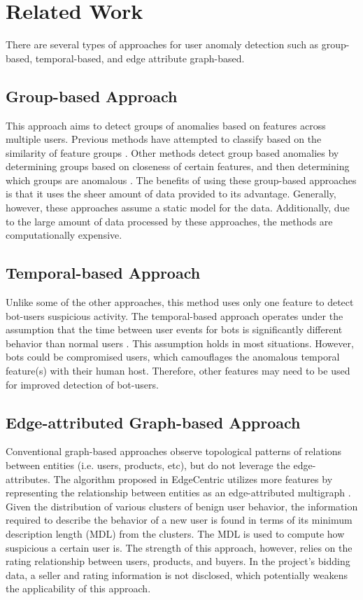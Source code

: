 \documentclass{article} %
\begin{document}
\section{Related Work}

There are several types of approaches for user anomaly detection such as group-based, temporal-based, and edge attribute graph-based.

\subsection{Group-based Approach}

This approach aims to detect groups of anomalies based on features across multiple users.
Previous methods have attempted to classify based on the similarity of feature groups \cite{ndsync}.
Other methods detect group based anomalies by determining groups based on closeness of certain features, and then determining which groups are anomalous \cite{glad}.
The benefits of using these group-based approaches is that it uses the sheer amount of data provided to its advantage.
Generally, however, these approaches assume a static model for the data.
Additionally, due to the large amount of data processed by these approaches, the methods are computationally expensive.

\subsection{Temporal-based Approach}

Unlike some of the other approaches, this method uses only one feature to detect bot-users suspicious activity.
The temporal-based approach operates under the assumption that the time between user events for bots is significantly different behavior than normal users \cite{birdnest} \cite{rsc} \cite{sfp} \cite{cicp}.
This assumption holds in most situations.
However, bots could be compromised users, which camouflages the anomalous temporal feature(s) with their human host.
Therefore, other features may need to be used for improved detection of bot-users.

\subsection{Edge-attributed Graph-based Approach}

Conventional graph-based approaches observe topological patterns of relations between entities (i.e. users, products, etc), but do not leverage the edge-attributes.
The algorithm proposed in EdgeCentric utilizes more features by representing the relationship between entities as an edge-attributed multigraph \cite{edgecentric}.
Given the distribution of various clusters of benign user behavior, the information required to describe the behavior of a new user is found in terms of its minimum description length (MDL) from the clusters.
The MDL is used to compute how suspicious a certain user is.
The strength of this approach, however, relies on the rating relationship between users, products, and buyers.
In the project's bidding data, a seller and rating information is not disclosed, which potentially weakens the applicability of this approach.
\end{document}
